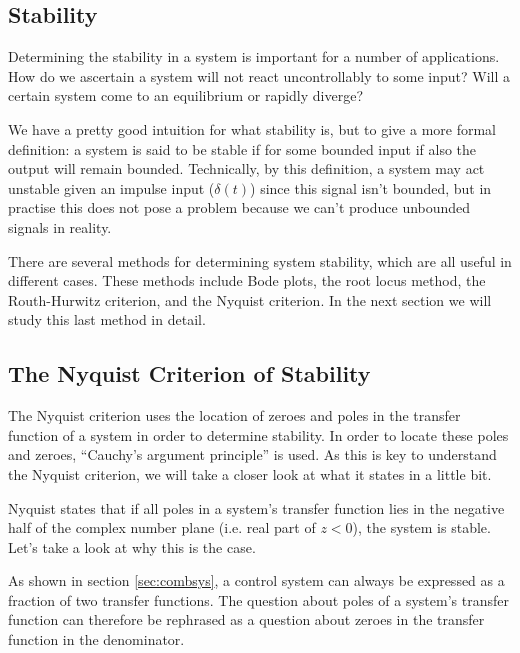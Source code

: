 \begin{newtext}
\section{Stability}
Determining the stability in a system is important for a number of applications. How do we ascertain a system will not react uncontrollably to some input? Will a certain system come to an equilibrium or rapidly diverge? 

We have a pretty good intuition for what stability is, but to give a more formal definition: a system is said to be stable if for some bounded input if also the output will remain bounded. Technically, by this definition, a system may act unstable given an impulse input ($\delta(t)$) since this signal isn't bounded, but in practise this does not pose a problem because we can't produce unbounded signals in reality.

There are several methods for determining system stability, which are all useful in different cases. These methods include Bode plots, the root locus method, the Routh-Hurwitz criterion, and the Nyquist criterion. In the next section we will study this last method in detail.

\subsection{The Nyquist Criterion of Stability}
The Nyquist criterion uses the location of zeroes and poles in the transfer function of a system in order to determine stability. In order to locate these poles and zeroes, ``Cauchy's argument principle'' is used. As this is key to understand the Nyquist criterion, we will take a closer look at what it states in a little bit.

Nyquist states that if all poles in a system's transfer function lies in the negative half of the complex number plane (i.e. real part of $z<0$), the system is stable. Let's take a look at why this is the case.

As shown in section \ref{sec:combsys}, a control system can always be expressed as a fraction of two transfer functions. The question about poles of a system's transfer function can therefore be rephrased as a question about zeroes in the transfer function in the denominator.


\end{newtext}
